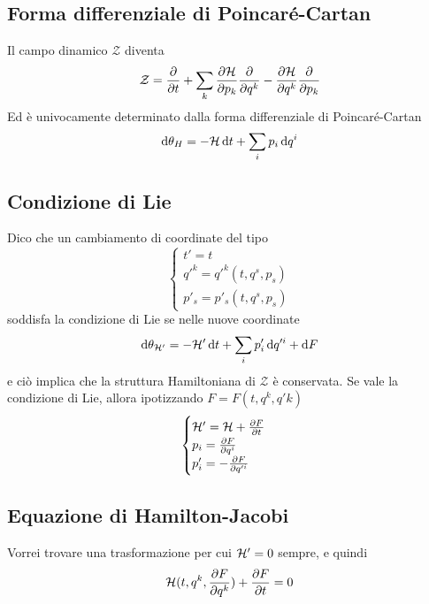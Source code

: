 \documentclass[11pt,landscape]{article}
\begin{document}
\begin{multicols}{3}
    \subsection{Forma differenziale di Poincaré-Cartan}
        Il campo dinamico $\mathcal{Z}$ diventa 
        $$ \mathcal{Z} = \frac{\partial }{\partial t} + \sum_k \frac{\partial \mathcal{H}}{\partial p_k} \frac{\partial }{\partial q^k} - \frac{\partial \mathcal{H}}{\partial q^k} \frac{\partial }{\partial p_k}$$
        Ed è univocamente determinato dalla forma differenziale di Poincaré-Cartan
        $$ \dif \theta_H = -\Ham \dif t + \sum_i p_i \dif q^i$$
    \subsection{Condizione di Lie}
        Dico che un cambiamento di coordinate del tipo 
        $$ \begin{cases}
            t' = t\\
            q'^k = q'^k (t, q^s, p_s)\\
            p'_s = p'_s(t, q^s, p_s)
        \end{cases}$$
        soddisfa la condizione di Lie se nelle nuove coordinate
        $$ \dif \theta_{\Ham'} = - \Ham' \dif t + \sum_i p'_i \dif q'^i + \dif F$$
        e ciò implica che la struttura Hamiltoniana di $\mathcal{Z}$ è conservata. 
        Se vale la condizione di Lie, allora ipotizzando $F = F(t, q^k, q'k)$
        $$ \begin{cases}
            \mathcal{H}' = \mathcal{H} + \frac{\partial F}{\partial t}\\
            p_i = \frac{\partial F}{\partial q^i}\\
            p'_i = - \frac{\partial F}{\partial q'^i}
        \end{cases}$$
    \subsection{Equazione di Hamilton-Jacobi}
        Vorrei trovare una trasformazione per cui $\mathcal{H}' = 0$ sempre, e quindi
        $$ \mathcal{H}(t, q^k, \frac{\partial F}{\partial q^k}) + \frac{\partial F}{\partial t} = 0$$
\end{multicols}
\end{document}
